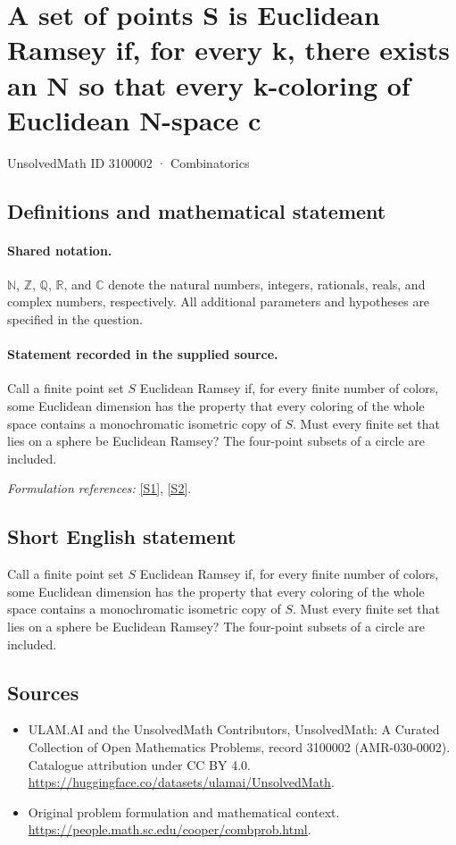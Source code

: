 \documentclass[11pt]{article}
\newcommand{\sref}[2]{\hyperlink{source:#1:#2}{[S#2]}}
\begin{document}
\setcounter{section}{3100001}
\section{A set of points S is Euclidean Ramsey if, for every k, there exists an N so that every k-coloring of Euclidean N-space c}\label{3100002}
{\small UnsolvedMath ID 3100002 · Combinatorics}
\subsection{Definitions and mathematical statement}

\paragraph{Shared notation.}$\mathbb N$, $\mathbb Z$, $\mathbb Q$, $\mathbb R$, and $\mathbb C$ denote the natural numbers, integers, rationals, reals, and complex numbers, respectively. All additional parameters and hypotheses are specified in the question.


\paragraph{Statement recorded in the supplied source.}
Call a finite point set $S$ Euclidean Ramsey if, for every finite number of colors, some Euclidean dimension has the property that every coloring of the whole space contains a monochromatic isometric copy of $S$. Must every finite set that lies on a sphere be Euclidean Ramsey? The four-point subsets of a circle are included.
\par\smallskip\textit{Formulation references:} \sref{3100002}{1}, \sref{3100002}{2}.
\subsection{Short English statement}
Call a finite point set $S$ Euclidean Ramsey if, for every finite number of colors, some Euclidean dimension has the property that every coloring of the whole space contains a monochromatic isometric copy of $S$. Must every finite set that lies on a sphere be Euclidean Ramsey? The four-point subsets of a circle are included.
\subsection{Sources}
\begin{itemize}
\item[\hypertarget{source:3100002:1}{S1}] ULAM.AI and the UnsolvedMath Contributors, UnsolvedMath: A Curated Collection of Open Mathematics Problems, record 3100002 (AMR-030-0002). Catalogue attribution under CC BY 4.0.
\url{https://huggingface.co/datasets/ulamai/UnsolvedMath}.
\item[\hypertarget{source:3100002:2}{S2}] Original problem formulation and mathematical context.
\url{https://people.math.sc.edu/cooper/combprob.html}.
\end{itemize}
\label{end:3100002}
\end{document}
